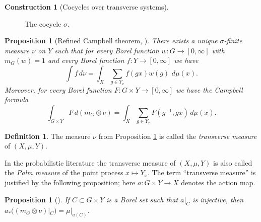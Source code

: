 \documentclass[11pt, oneside]{amsart}
\newtheorem{prop}[lemma]{Proposition}
\theoremstyle{definition}
\newtheorem{defn}[lemma]{Definition}
\newtheorem{con}[lemma]{Construction}
\theoremstyle{remark}
\theoremstyle{TheoremNum}
\begin{document}
\begin{con}[Cocycles over transverse systems]
\begin{center}
\begin{figure}[!ht]
\caption{The cocycle $\sigma$.}
  \end{figure}
\end{center}
\end{con}
\begin{prop}[{Refined Campbell theorem, \cite[Proposition\ 4.2]{ABC}}]\label{Campbell} There exists a unique $\sigma$-finite measure $\nu$ on $Y$ such that for every Borel function $w: G \to [0, \infty]$ with $m_G(w) = 1$ and every Borel function $f: Y \to [0, \infty]$ we have
\begin{equation}
\int f \, d \nu = \int_X \sum_{g \in Y_x} f(g x) w(g) \, \, d \mu(x).
\end{equation}
Moreover, for every Borel function $F: G \times Y \to [0, \infty]$ we have the Campbell formula
\begin{equation}\label{equation:formula:integral}
\int_{G \times Y} F \, d(m_G \otimes \nu) = \int_X \sum_{g \in Y_x} F(g^{-1}, g x)\, d\mu(x).
\end{equation}
\end{prop}
\begin{defn} The measure $\nu$ from Proposition \ref{Campbell} is called the \emph{transverse measure} of $(X, \mu, Y)$.
\end{defn}
In the probabilistic literature the transverse measure of $(X, \mu, Y)$ is also called the \emph{Palm measure} of the point process $x \mapsto Y_x$. The term ``transverse measure'' is justified by the following proposition; here $a: G \times Y \to X$ denotes the action map.
\begin{prop}[{\cite[Proposition\ 4.9]{ABC}}]\label{TransverseMeasure} If $C \subset G \times Y$ is a Borel set such that $a|_C$ is injective, then $a_*((m_G \otimes \nu)|_C) = \mu|_{a(C)}$.
\end{prop}
\end{document}
